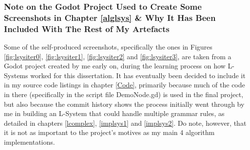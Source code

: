 \subsubsection{Note on the Godot Project Used to Create Some Screenshots in Chapter \ref{alglsys} \& Why It Has Been Included With The Rest of My Artefacts}

Some of the self-produced screenshots, specifically the ones in Figures \ref{fig:lsysiter0}, \ref{fig:lsysiter1}, \ref{fig:lsysiter2} and \ref{fig:lsysiter3}, are taken from a Godot project created by me early on, during the learning process on how L-Systems worked for this dissertation. It has eventually been decided to include it in my source code listings in chapter \ref{Code}, primarily because much of the code in there (specifically in the script file DemoNode.gd) is used in the final project, but also because the commit history shows the process initially went through by me in building an L-System that could handle multiple grammar rules, as detailed in chapters \ref{lcomplex}, \ref{implsys1} and \ref{implsys2}. Do note, however, that it is not as important to the project's motives as my main 4 algorithm implementations. 